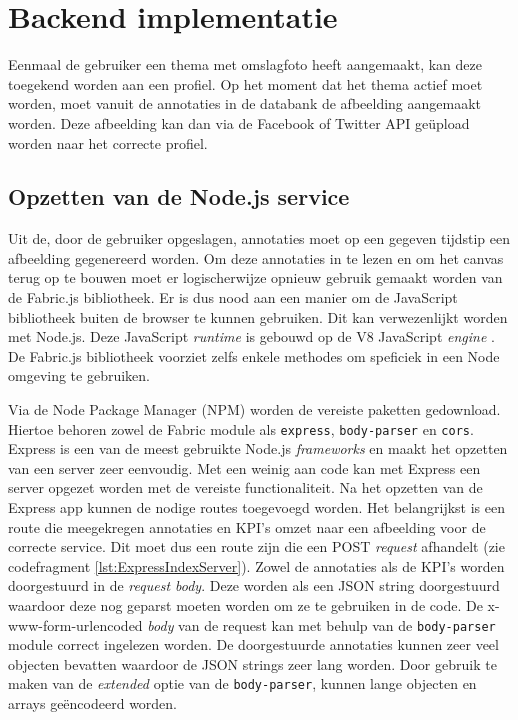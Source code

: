 

\section{Backend implementatie}\label{BackendImplementatie}

Eenmaal de gebruiker een thema met omslagfoto heeft aangemaakt, kan deze toegekend worden aan een profiel. Op het moment dat het thema actief moet worden, moet vanuit de annotaties in de databank de afbeelding aangemaakt worden. Deze afbeelding kan dan via de Facebook of Twitter API ge\"{u}pload worden naar het correcte profiel.

\subsection{Opzetten van de Node.js service}
Uit de, door de gebruiker opgeslagen, annotaties moet op een gegeven tijdstip een afbeelding gegenereerd worden. Om deze annotaties in te lezen en om het canvas terug op te bouwen moet er logischerwijze opnieuw gebruik gemaakt worden van de Fabric.js bibliotheek. Er is dus nood aan een manier om de JavaScript bibliotheek buiten de browser te kunnen gebruiken. Dit kan verwezenlijkt worden met Node.js. Deze JavaScript \textit{runtime} is gebouwd op de V8 JavaScript \textit{engine} \cite{NodeJS}. De Fabric.js bibliotheek voorziet zelfs enkele methodes om speficiek in een Node omgeving te gebruiken.

Via de Node Package Manager (NPM) worden de vereiste paketten gedownload. Hiertoe behoren zowel de Fabric module als \texttt{express}, \texttt{body-parser} en \texttt{cors}. Express is een van de meest gebruikte Node.js \textit{frameworks} en maakt het opzetten van een server zeer eenvoudig. Met een weinig aan code kan met Express een server opgezet worden met de vereiste functionaliteit. Na het opzetten van de Express app kunnen de nodige routes toegevoegd worden. Het belangrijkst is een route die meegekregen annotaties en KPI's omzet naar een afbeelding voor de correcte service. Dit moet dus een route zijn die een POST \textit{request} afhandelt (zie codefragment \ref{lst:ExpressIndexServer}). Zowel de annotaties als de KPI's worden doorgestuurd in de \textit{request body}. Deze worden als een JSON string doorgestuurd waardoor deze nog geparst moeten worden om ze te gebruiken in de code. De x-www-form-urlencoded \textit{body} van de request kan met behulp van de \texttt{body-parser} module correct ingelezen worden. De doorgestuurde annotaties kunnen zeer veel objecten bevatten waardoor de JSON strings zeer lang worden. Door gebruik te maken van de \textit{extended} optie van de \texttt{body-parser}, kunnen lange objecten en arrays ge\"{e}ncodeerd worden. 

